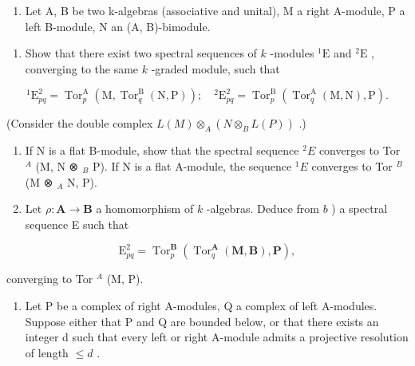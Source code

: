 \begin{enumerate}
\def\labelenumi{\arabic{enumi})}
\setcounter{enumi}{7}
\tightlist
\item
  Let A, B be two k-algebras (associative and unital), M a right A-module, P a left B-module, N an (A, B)-bimodule.
\end{enumerate}

\begin{enumerate}
\def\labelenumi{\alph{enumi})}
\tightlist
\item
  Show that there exist two spectral sequences of \(k\) -modules \({}^{1}\mathrm{E}\) and \({}^{2}\mathrm{E}\) , converging to the same \(k\) -graded module, such that
\end{enumerate}

\[
{ } ^ { 1 } \mathrm{E} _ { p q } ^ { 2 } = \operatorname{Tor} _ { p } ^ { \mathrm{A} } ( \mathrm{M} , \operatorname{Tor} _ { q } ^ { \mathrm{B} } ( \mathrm{N} , \mathrm{P} ) ) ; \quad { } ^ { 2 } \mathrm{E} _ { p q } ^ { 2 } = \operatorname{Tor} _ { p } ^ { \mathrm{B} } ( \operatorname{Tor} _ { q } ^ { \mathrm{A} } ( \mathrm{M} , \mathrm{N} ) , \mathrm{P} ) .
\]

(Consider the double complex \(L(M) \otimes_{A} (N \otimes_{B} L(P))\) .)

\begin{enumerate}
\def\labelenumi{\alph{enumi})}
\setcounter{enumi}{1}
\item
  If N is a flat B-module, show that the spectral sequence \({}^{2}E\) converges to Tor \(^{A}\) (M, N ⊗ \(_{B}\) P). If N is a flat A-module, the sequence \({}^{1}E\) converges to Tor \(^{B}\) (M ⊗ \(_{A}\) N, P).
\item
  Let \(\rho: \mathbf{A} \to \mathbf{B}\) a homomorphism of \(k\) -algebras. Deduce from \(b\) ) a spectral sequence E such that
\end{enumerate}

\[
\mathrm{E} _ {p q} ^ {2} = \operatorname{Tor} _ {p} ^ {\mathbf {B}} \left(\operatorname{Tor} _ {q} ^ {\mathbf {A}} (\mathbf {M}, \mathbf {B}), \mathbf {P}\right),
\]

converging to Tor \(^{A}\) (M, P).

\begin{enumerate}
\def\labelenumi{\arabic{enumi})}
\setcounter{enumi}{8}
\tightlist
\item
  Let P be a complex of right A-modules, Q a complex of left A-modules. Suppose either that P and Q are bounded below, or that there exists an integer d such that every left or right A-module admits a projective resolution of length \(\leqslant d\) .
\end{enumerate}

